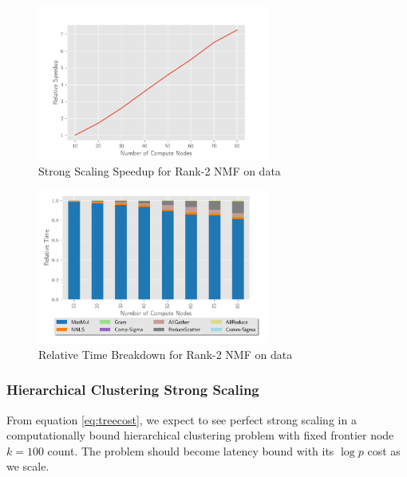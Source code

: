 \begin{figure}
\begin{center}
\includegraphics[height=2in, width=\columnwidth]{plots/realworld_rank2_speedup.pdf}
\caption{Strong Scaling Speedup for Rank-2 NMF on \image{} data}
\label{fig:rwrank2speedup}
\end{center}
\end{figure}

\begin{figure}
\begin{center}
\includegraphics[height=2in, width=\columnwidth]{plots/realworld_rank2_strongscaling.pdf}
\caption{Relative Time Breakdown for Rank-2 NMF on \image{} data}
\label{fig:rwrank2strongscaling}
\end{center}
\end{figure}


\subsubsection{Hierarchical Clustering Strong Scaling}
\label{sec:hiernmf2scaling}




From equation \ref{eq:treecost}, we expect to see perfect strong scaling in a computationally bound hierarchical clustering problem with fixed frontier node $k=100$ count.
The problem should become latency bound with its $\log p$ cost as we scale. 

